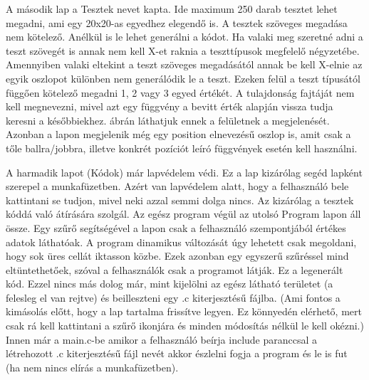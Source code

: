 \documentclass[12pt,a4paper,oneside]{report}
\begin{document}
    
      
    A második lap a Tesztek nevet kapta. Ide maximum 250 darab tesztet lehet megadni, ami egy 20x20-as egyedhez elegendő is.
    A tesztek szöveges megadása nem kötelező.
    Anélkül is le lehet generálni a kódot.
    Ha valaki meg szeretné adni a teszt szövegét is annak nem kell X-et raknia a teszttípusok megfelelő négyzetébe.
    Amennyiben valaki eltekint a teszt szöveges megadásától annak be kell X-elnie az egyik oszlopot különben nem generálódik le a teszt.
    Ezeken felül a teszt típusától függően kötelező megadni 1, 2 vagy 3 egyed értékét.
    A tulajdonság fajtáját nem kell megnevezni, mivel azt egy függvény a bevitt érték alapján vissza tudja keresni a későbbiekhez.
     ábrán láthatjuk ennek a felületnek a megjelenését.
    Azonban a lapon megjelenik még egy position elnevezésű oszlop is, amit csak a tőle ballra/jobbra, illetve konkrét pozíciót leíró függvények esetén kell használni.
    
    A harmadik lapot (Kódok) már lapvédelem védi.
    Ez a lap kizárólag segéd lapként szerepel a munkafüzetben.
    Azért van lapvédelem alatt, hogy a felhasználó bele kattintani se tudjon, mivel neki azzal semmi dolga nincs. Az kizárólag a tesztek kóddá való átírására szolgál.
    Az egész program végül az utolsó Program lapon áll össze.
    Egy szűrő segítségével a lapon csak a felhasználó szempontjából értékes adatok láthatóak.
    A program dinamikus változását úgy lehetett csak megoldani, hogy sok üres cellát iktasson közbe.
    Ezek azonban egy egyszerű szűréssel mind eltüntethetőek, szóval a felhasználók csak a programot látják. Ez a legenerált kód.
    Ezzel nincs más dolog már, mint kijelölni az egész látható területet (a felesleg el van rejtve) és beilleszteni egy .c kiterjesztésű fájlba. (Ami fontos a kimásolás előtt, hogy a lap tartalma frissítve legyen.
    Ez könnyedén elérhető, mert csak rá kell kattintani a szűrő ikonjára és minden módosítás nélkül le kell okézni.)
    Innen már a main.c-be amikor a felhasználó beírja include paranccsal a létrehozott .c kiterjesztésű fájl nevét akkor észlelni fogja a program és le is fut (ha nem nincs elírás a munkafüzetben).
\end{document}
